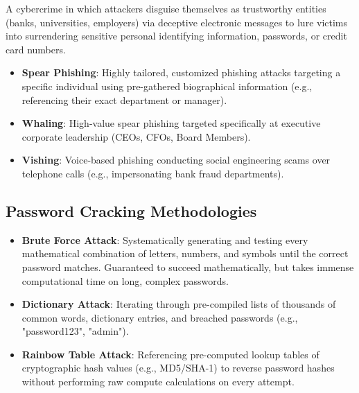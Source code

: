 \begin{definition}[Phishing]
A cybercrime in which attackers disguise themselves as trustworthy entities (banks, universities, employers) via deceptive electronic messages to lure victims into surrendering sensitive personal identifying information, passwords, or credit card numbers.
\end{definition}

\begin{itemize}[leftmargin=1.5em]
    \item \textbf{Spear Phishing}: Highly tailored, customized phishing attacks targeting a specific individual using pre-gathered biographical information (e.g., referencing their exact department or manager).
    \item \textbf{Whaling}: High-value spear phishing targeted specifically at executive corporate leadership (CEOs, CFOs, Board Members).
    \item \textbf{Vishing}: Voice-based phishing conducting social engineering scams over telephone calls (e.g., impersonating bank fraud departments).
\end{itemize}

\subsection{Password Cracking Methodologies}
\begin{itemize}[leftmargin=1.5em]
    \item \textbf{Brute Force Attack}: Systematically generating and testing every mathematical combination of letters, numbers, and symbols until the correct password matches. Guaranteed to succeed mathematically, but takes immense computational time on long, complex passwords.
    \item \textbf{Dictionary Attack}: Iterating through pre-compiled lists of thousands of common words, dictionary entries, and breached passwords (e.g., "password123", "admin").
    \item \textbf{Rainbow Table Attack}: Referencing pre-computed lookup tables of cryptographic hash values (e.g., MD5/SHA-1) to reverse password hashes without performing raw compute calculations on every attempt.
\end{itemize}

